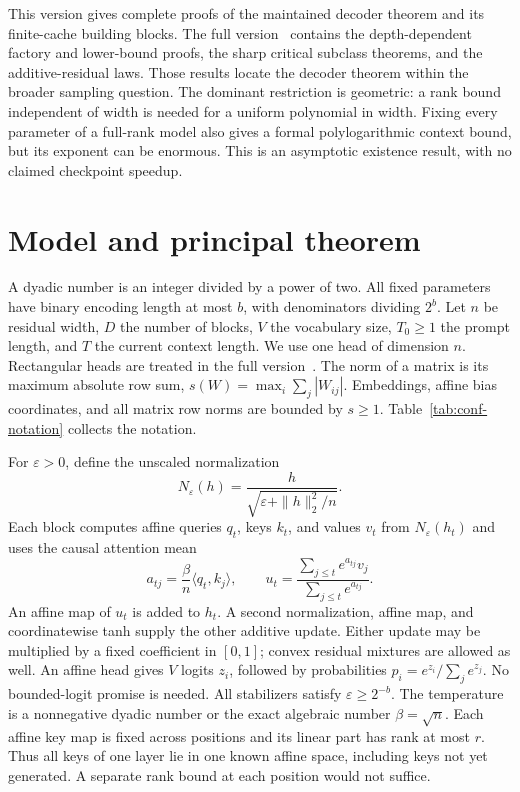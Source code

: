 \documentclass[11pt]{article}
\theoremstyle{definition}\newtheorem{definition}[theorem]{Definition}
\theoremstyle{remark}\newtheorem{remark}[theorem]{Remark}
\numberwithin{equation}{section}
\begin{document}
This version gives complete proofs of the maintained decoder theorem
and its finite-cache building blocks. The full version~\cite{mausbergfull2026}
contains the depth-dependent factory and lower-bound proofs, the sharp
critical subclass theorems, and the additive-residual laws. Those results locate
the decoder theorem within the broader sampling question. The dominant
restriction is geometric: a rank bound independent of width is needed
for a uniform polynomial in width. Fixing every parameter of a full-rank
model also gives a formal polylogarithmic context bound, but its exponent
can be enormous. This is an asymptotic existence result, with no claimed
checkpoint speedup.

\section{Model and principal theorem}
\label{sec:conf-model}

A dyadic number is an integer divided by a power of two. All fixed
parameters have binary encoding length at most $b$, with denominators
dividing $2^b$. Let $n$ be residual width, $D$ the number of blocks,
$V$ the vocabulary size, $T_0\ge1$ the prompt length, and $T$ the current
context length. We use one head of dimension $n$. Rectangular
heads are treated in the full version~\cite{mausbergfull2026}.
The norm of a matrix is its maximum absolute row sum,
$s(W)=\max_i\sum_j|W_{ij}|$. Embeddings, affine bias coordinates, and
all matrix row norms are bounded by $s\ge1$.
Table~\ref{tab:conf-notation} collects the notation.

For $\varepsilon>0$, define the unscaled normalization
\[
 N_\varepsilon(h)=\frac{h}{\sqrt{\varepsilon+\|h\|_2^2/n}}.
\]
Each block computes affine queries $q_t$, keys $k_t$, and values $v_t$
from $N_\varepsilon(h_t)$ and uses the causal attention mean
\begin{equation}
 a_{tj}=\frac\beta n\langle q_t,k_j\rangle,\qquad
 u_t=\frac{\sum_{j\le t}e^{a_{tj}}v_j}{\sum_{j\le t}e^{a_{tj}}}.
 \label{eq:conf-attention}
\end{equation}
An affine map of $u_t$ is added to $h_t$. A second normalization,
affine map, and coordinatewise tanh supply the other additive update.
Either update may be multiplied by a fixed coefficient in $[0,1]$;
convex residual mixtures are allowed as well. An affine head gives
$V$ logits $z_i$, followed by probabilities
$p_i=e^{z_i}/\sum_j e^{z_j}$. No bounded-logit promise is needed.
All stabilizers satisfy $\varepsilon\ge2^{-b}$. The temperature is a
nonnegative dyadic number or the exact algebraic number $\beta=\sqrt n$.
Each affine key map is fixed across positions and its linear part has
rank at most $r$. Thus all keys of one layer lie in one known affine
space, including keys not yet generated. A separate rank bound at each
position would not suffice.
\end{document}
